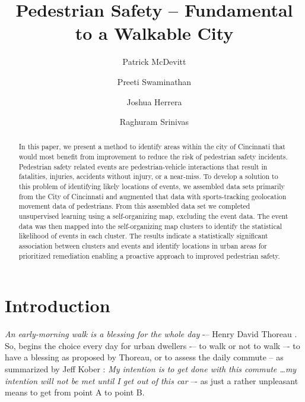 \documentclass{llncs}
\begin{document}
\setlength{\parskip}{0pt}
%
%
\title{Pedestrian Safety -- Fundamental to a Walkable City}
%
\author{Patrick McDevitt \and Preeti Swaminathan
\and Joshua Herrera \and Raghuram Srinivas}
%

\maketitle              %

\begin{abstract}
In this paper, we present a method to identify areas within the city of Cincinnati that would most benefit from improvement to reduce the risk of pedestrian safety incidents. Pedestrian safety related events are pedestrian-vehicle interactions that result in fatalities, injuries, accidents without injury, or a near-miss. To develop a solution to this problem of identifying likely locations of events, we assembled data sets primarily from the City of Cincinnati and augmented that data with sports-tracking geolocation movement data of pedestrians. From this assembled data set we completed unsupervised learning using a self-organizing map, excluding the event data. The event data was then mapped into the self-organizing map clusters to identify the statistical likelihood of events in each cluster. The results indicate a statistically significant association between clusters and events and identify locations in urban areas for prioritized remediation enabling a proactive approach to improved pedestrian safety.
\end{abstract}
%
\section{Introduction}
%
\emph{An early-morning walk is a blessing for the whole day} -– Henry David Thoreau \cite{thoreau1906writings}. So, begins the choice every day for urban dwellers -– to walk or not to walk –- to have a blessing as proposed by Thoreau, or to assess the daily commute -- as summarized by Jeff Kober \cite{bowen2015zen}: \emph{My intention is to get done with this commute \dots my intention will not be met until I get out of this car} –- as just a rather unpleasant means to get from point A to point B.
\end{document}
